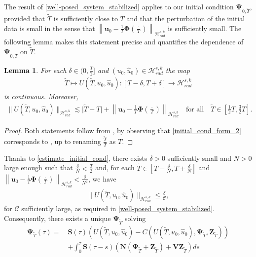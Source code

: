 \documentclass[12pt,reqno]{amsart}
\theoremstyle{plain}
\theoremstyle{remark}
\theoremstyle{plain}
\newtheorem{lemma}[theorem]{Lemma}
\theoremstyle{definition}
\numberwithin{equation}{section}
\numberwithin{equation}{section}
\newcommand{\norm}[1]{\left\|#1\right\|}
\newcommand{\HH}{\mathcal{H}}
\begin{document}
	The result of \autoref{well-posed_system_stabilized} applies to our initial condition $\mathbf{\Psi}_{0,\tilde{T}}$, provided that $\tilde{T}$ is sufficiently close to $T$ and that the perturbation of the initial data is small in the sense that $\norm{\mathbf{u}_0-\frac{1}{T}\mathbf{\Phi}\left(\frac{\cdot}{T}\right)}_{\HH_{rad}^{s,k}}$ is sufficiently small.
    The following lemma makes this statement precise and quantifies the dependence of $\mathbf{\Psi}_{0,\tilde{T}}$ on $\tilde{T}.$
    \begin{lemma}\label{estimate_initial_cond}
		For each $\delta\in (0,\frac{T}{2}]$ and $(u_0,\hat{u}_0)\in \HH_{rad}^{s,k}$ the map \begin{align*}
			\tilde{T}\mapsto U(\tilde{T}, u_0, \hat{u}_0): [T-\delta,T+\delta]\rightarrow \HH_{rad}^{s,k}
		\end{align*}
		is continuous. Moreover,
		\begin{align*}
			\lVert U(\tilde{T}, u_0, \hat{u}_0)\rVert_{\HH_{rad}^{s,k}}\lesssim \lvert \tilde{T}-T\rvert+\norm{\mathbf{u}_0-\frac{1}{T}\mathbf{\Phi}\left(\frac{\cdot}{T}\right)}_{\HH_{rad}^{s,k}}\quad \text{for all} \quad \tilde{T}\in \left[\frac{1}{2}T,\frac{3}{2}T\right].
		\end{align*}
	\end{lemma}
	\begin{proof}
		Both statements follow from \cite[Lemma 8.2]{glogic2025globally}, by observing that \eqref{initial_cond_form_2} corresponds to \cite[equation (8.7)]{glogic2025globally}, up to renaming $\frac{\tilde{T}}{T}$ as $T$.
	\end{proof}
	Thanks to \autoref{estimate_initial_cond}, there exists $\delta>0$ sufficiently small and $N>0$ large enough such that $\frac{\delta}{N}<\frac{T}{2}$ and, for each $\tilde{T}\in [T-\frac{\delta}{N}, T+\frac{\delta}{N}]$ and $\norm{\mathbf{u}_0-\frac{1}{T}\mathbf{\Phi}\left(\frac{\cdot}{T}\right)}_{\HH_{rad}^{s,k}}<\frac{\delta}{N^2}$, we have 
	\begin{align*}
		\lVert U(\tilde{T}, u_0, \hat{u}_0)\rVert_{\HH_{rad}^{s,k}}\leq \frac{\delta}{\mathcal{C}},
	\end{align*}
	for $\mathcal{C}$ sufficiently large, as required in \autoref{well-posed_system_stabilized}. Consequently, there exists a unique $\mathbf{\Psi}_{\tilde{T}}$ solving
	\begin{align*}
		\mathbf{\Psi}_{\tilde{T}}(\tau)=\ &\mathbf{S}(\tau)\left(U(\tilde{T}, u_0, \hat{u}_0)-C(U(\tilde{T}, u_0, \hat{u}_0),\mathbf{\Psi}_{\tilde{T}},\mathbf{Z}_{\tilde{T}})\right)  
		\\ &+\int_0^\tau \mathbf{S}(\tau-s)\left(\mathbf{N}(\mathbf{\Psi}_{\tilde{T}}+\mathbf{Z}_{\tilde{T}})+\mathbf{V}\mathbf{Z}_{\tilde{T}}\right) ds
	\end{align*}
\end{document}
